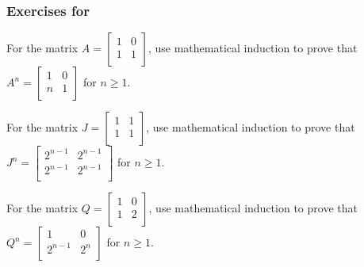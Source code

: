 
\subsubsection*{Exercises for 
\subpffindmatrix}

\begin{exer}[\exerP] %
\label{exer_prove_power_shear_matrix}
    For the matrix $A=\left[ \begin{array}{cc} 1 & 0 \\ 1 & 1 \\ \end{array} \right]$, use mathematical induction to prove that $A^n = \left[ \begin{array}{cc} 1 & 0 \\ n & 1 \\ \end{array} \right]$ for $n\ge 1$. 
\end{exer}

\begin{exer}[\exerU] %
\label{exer_prove_power_unit_matrix}
    For the matrix $J=\left[ \begin{array}{cc} 1 & 1 \\ 1 & 1 \\ \end{array} \right]$, use mathematical induction to prove that $J^n=\left[ \begin{array}{cc} 2^{n-1} & 2^{n-1} \\ 2^{n-1} & 2^{n-1} \\ \end{array} \right]$ for $n\ge 1$.
\end{exer}

\begin{exer}[\exerU] %
\label{exer_prove_power_another_matrix}
    For the matrix $Q=\left[ \begin{array}{cc} 1 & 0 \\ 1 & 2 \\ \end{array} \right]$, use mathematical induction to prove that $Q^n=\left[ \begin{array}{cc} 1 & 0 \\ 2^{n-1} & 2^n \\ \end{array} \right]$ for $n\ge 1$.
\end{exer}

